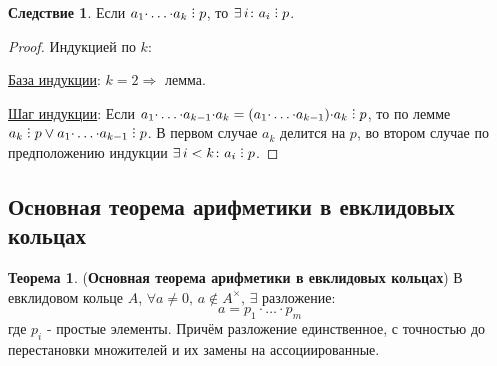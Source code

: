 \documentclass[12pt]{article}
\theoremstyle{definition}
\newtheorem{theorem}{Теорема}
\newtheorem{corollary}{Следствие}
\DeclareRobustCommand{\divby}{%
	\mathrel{\text{\vbox{\baselineskip.65ex\lineskiplimit0pt\hbox{.}\hbox{.}\hbox{.}}}}%
}
\begin{document}
\begin{corollary}
	Если $a_1{\cdot}\dotsc{\cdot}a_k \divby p$, то $\exists \, i \colon a_i \divby p$.
\end{corollary}
\begin{proof}
	Индукцией по $k$:
	
	\uline{База индукции}: $k = 2 \Rightarrow$ лемма.
	
	\uline{Шаг индукции}: Если $a_1{\cdot}\dotsc{\cdot}a_{k-1}{\cdot}a_k = (a_1{\cdot}\dotsc{\cdot}a_{k-1}){\cdot}a_k \divby p$, то по лемме $a_{k} \divby p \vee a_1{\cdot}\dotsc{\cdot}a_{k-1} \divby p$. В первом случае $a_{k}$ делится на $p$, во втором случае по предположению индукции $\exists \, i < k \colon a_i \divby p$.
\end{proof}

\subsection*{Основная теорема арифметики в евклидовых кольцах}
\begin{theorem}(\textbf{Основная теорема арифметики в евклидовых кольцах})
	В евклидовом кольце $A$, $\forall a \neq 0, \, a\notin A^{\times}, \, \exists$ разложение: 
	$$
		a = p_1{\cdot}\dotsc{\cdot}p_m
	$$ 
	где $p_i$ - простые элементы. Причём разложение единственное, с точностью до перестановки множителей и их замены на ассоциированные.
\end{theorem}
\end{document}
